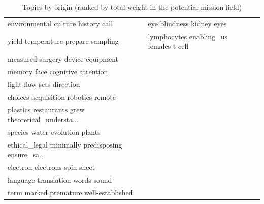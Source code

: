 \documentclass[11pt]{article}
\begin{document}
\begin{landscape}
\begin{table}
\begin{tabular}{lll}
                environmental culture history call &                          eye blindness kidney eyes &                                                    \\
                yield temperature prepare sampling &             lymphocytes enabling\_us females t-cell &                                                    \\
                 measured surgery device equipment &                                                    &                                                    \\
                   memory face cognitive attention &                                                    &                                                    \\
                         light flow sets direction &                                                    &                                                    \\
               choices acquisition robotics remote &                                                    &                                                    \\
 plastics restaurants grew theoretical\_understa... &                                                    &                                                    \\
                    species water evolution plants &                                                    &                                                    \\
 ethical\_legal minimally predisposing ensure\_sa... &                                                    &                                                    \\
                     electron electrons spin sheet &                                                    &                                                    \\
                  language translation words sound &                                                    &                                                    \\
            term marked premature well-established &                                                    &                                                    \\
\hline
\bottomrule
\end{tabular}
\caption{Topics by origin (ranked by total weight in the potential mission field)}
\end{table}
\label{tab:topics}
\end{landscape}
\end{document}
